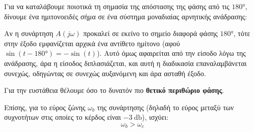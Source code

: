 \documentclass[11pt,a4paper,notitlepage,fleqn,final]{article}
\begin{document}
Για να καταλάβουμε ποιοτικά τη σημασία της απόστασης της φάσης από τις \( \ang{180} \),
δίνουμε ένα ημιτονοειδές σήμα σε ένα σύστημα μοναδιαίας αρνητικής ανάδρασης:


Αν η συνάρτηση \( A(j\omega) \) προκαλεί σε εκείνο το σημείο διαφορά φάσης \( \ang{180} \),
τότε στην έξοδο εμφανίζεται αρχικά ένα αντίθετο ημίτονο (αφού \( \sin(t-\ang{180})=-\sin(t)
 \)). Αυτό όμως αφαιρείται από την είσοδο λόγω της ανάδρασης, άρα η είσοδος διπλασιάζεται,
και αυτή η διαδικασία επαναλαμβάνεται συνεχώς, οδηγώντας σε συνεχώς αυξανόμενη και άρα
ασταθή έξοδο.

Για την ευστάθεια θέλουμε όσο το δυνατόν πιο \textbf{θετικό περιθώριο φάσης}.

Επίσης, για το εύρος ζώνης \( \omega_b \) της συνάρτησης (δηλαδή το εύρος μεταξύ των
συχνοτήτων στις οποίες το κέρδος είναι \( \SI{-3}{\decibel} \)), ισχύει:
\[
\boxed{\omega_b > \omega_c}
\]
\end{document}
